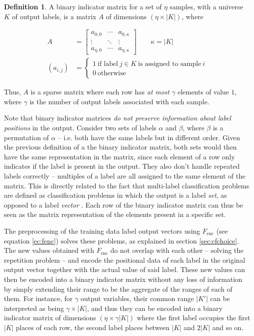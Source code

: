 \documentclass{kthreport}
\theoremstyle{definition}
\newtheorem{definition}{Definition}
\begin{document}
\begin{definition}
	A binary indicator matrix for a set of $\eta$ samples, with a universe $K$ of output labels, is a matrix $A$ of dimensions $(\eta \times |K|)$, where
    
    \begin{align}
        A &= 
        \begin{bmatrix}
        a_{0,0} & \cdots & a_{0, \kappa}\\
        \vdots & \ddots & \vdots \\
        a_{\eta, 0} & \cdots & a_{\eta, \kappa}
        \end{bmatrix}
        \qquad \kappa = |K|\\
    	(a_{i,j}) &= \begin{cases}
        	1\ \text{if label}\ j \in K\ \text{is assigned to sample}\ i \\
        	0\ \text{otherwise}
    	\end{cases}
    \end{align}
	
	Thus, $A$ is a sparse matrix where each row has \emph{at most} $\gamma$ elements of value $1$, where $\gamma$ is the number of output labels associated with each sample.
\end{definition}

Note that binary indicator matrices \emph{do not preserve information about label positions} in the output.
Consider two sets of labels $\alpha$ and $\beta$, where $\beta$ is a permutation of $\alpha$ -- i.e. both have the same labels but in different order. 
Given the previous definition of a the binary indicator matrix, both sets would then have the same representation in the matrix, since each element of a row only indicates if the label is present in the output. 
They also don't handle repeated labels correctly -- multiples of a label are all assigned to the same element of the matrix. This is directly related to the fact that multi-label classification problems are defined as classification problems in which the output is a label \emph{set}, as opposed to a label \emph{vector} \autocite{tsoumakas2006multi}. Each row of the binary indicator matrix can thus be seen as the matrix representation of the elements present in a specific set.

The preprocessing of the training data label output vectors using $F_{\text{enc}}$ (see equation \ref{ec:fenc}) solves these problems, as explained in section \ref{sec:cfchoice}. The new values obtained with $F_{\text{enc}}$ do not overlap with each other -- solving the repetition problem -- and encode the positional data of each label in the original output vector together with the actual value of said label. 
These new values can then be encoded into a binary indicator matrix without any loss of information by simply extending their range to be the aggregate of the ranges of each of them. 
For instance, for $\gamma$ output variables, their common range $|K'|$ can be interpreted as being $\gamma \times |K|$, and thus they can be encoded into a binary indicator matrix of dimensions $(\eta \times \gamma|K|)$ where the first label occupies the first $|K|$ places of each row, the second label places between $|K|$ and $2|K|$ and so on.
 
\end{document}

